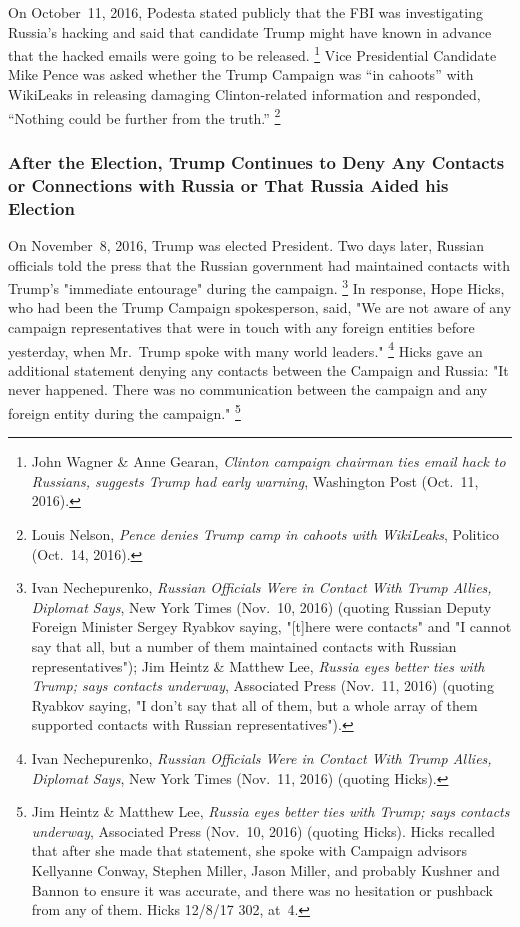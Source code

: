 On October~11, 2016, Podesta stated publicly that the FBI was investigating Russia's hacking and said that candidate Trump might have known in advance that the hacked emails were going to be released.%
\footnote{John Wagner \& Anne Gearan, \textit{Clinton campaign chairman ties email hack to Russians, suggests Trump had early warning}, Washington Post (Oct.~11, 2016).}
Vice Presidential Candidate Mike Pence was asked whether the Trump Campaign was ``in cahoots'' with WikiLeaks in releasing damaging Clinton-related information and responded, ``Nothing could be further from the truth.''%
\footnote{Louis Nelson, \textit{Pence denies Trump camp in cahoots with WikiLeaks}, Politico (Oct.~14, 2016).}

\subsubsection{After the Election, Trump Continues to Deny Any Contacts or Connections with Russia or That Russia Aided his Election}

On November~8, 2016, Trump was elected President.
Two days later, Russian officials told the press that the Russian government had maintained contacts with Trump's "immediate entourage" during the campaign.%
\footnote{Ivan Nechepurenko, \textit{Russian Officials Were in Contact With Trump Allies, Diplomat Says}, New York Times (Nov.~10, 2016) (quoting Russian Deputy Foreign Minister Sergey Ryabkov saying, "[t]here were contacts" and "I cannot say that all, but a number of them maintained contacts with Russian representatives");
Jim Heintz \& Matthew Lee, \textit{Russia eyes better ties with Trump; says contacts underway}, Associated Press (Nov.~11, 2016) (quoting Ryabkov saying, "I don't say that all of them, but a whole array of them supported contacts with Russian representatives").}
In response, Hope Hicks, who had been the Trump Campaign spokesperson, said, "We are not aware of any campaign representatives that were in touch with any foreign entities before yesterday, when Mr.~Trump spoke with many world leaders."%
\footnote{Ivan Nechepurenko, \textit{Russian Officials Were in Contact With Trump Allies, Diplomat Says}, New York Times (Nov.~11, 2016) (quoting Hicks).}
Hicks gave an additional statement denying any contacts between the Campaign and Russia:
"It never happened.
There was no communication between the campaign and any foreign entity during the campaign."%
\footnote{Jim Heintz \& Matthew Lee, \textit{Russia eyes better ties with Trump; says contacts underway}, Associated Press (Nov.~10, 2016) (quoting Hicks).
Hicks recalled that after she made that statement, she spoke with Campaign advisors Kellyanne Conway, Stephen Miller, Jason Miller, and probably Kushner and Bannon to ensure it was accurate, and there was no hesitation or pushback from any of them.
Hicks 12/8/17 302, at~4.}

